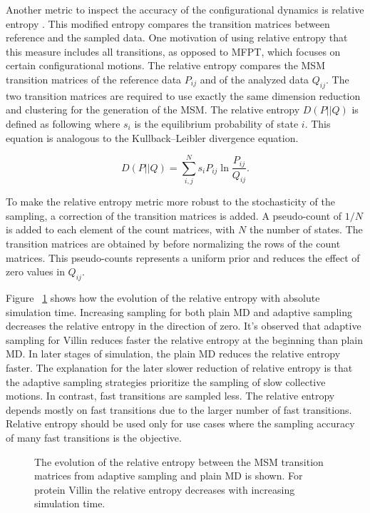 Another metric to inspect the accuracy of the configurational dynamics is relative entropy \cite{bowman2010enhanced}. This modified entropy compares the transition matrices between reference and the sampled data. One motivation of using relative entropy that this measure includes all transitions, as opposed to MFPT, which focuses on certain configurational motions. 
The relative entropy compares the MSM transition matrices of the reference data $P_{ij}$ and of the analyzed data $Q_{ij}$. The two transition matrices are required to use exactly the same dimension reduction and clustering for the generation of the MSM. The relative entropy $D(P||Q)$ is defined as following where $s_{i}$ is the equilibrium probability of state $i$. This equation is analogous to the Kullback–Leibler divergence equation.

\begin{equation}
D(P||Q)=\sum_{i,j}^{N}s_{i}P_{ij}\ln\frac{P_{ij}}{Q_{ij}}. 
\end{equation}

To make the relative entropy metric more robust to the stochasticity of the sampling, a correction of the transition matrices is added. A pseudo-count of $1/N$ is added to each element of the count matrices, with $N$ the number of states. The transition matrices are obtained by before normalizing the rows of the count matrices. This pseudo-counts represents a uniform prior and reduces the effect of zero values in $Q_{ij}$.

Figure ~\ref{fig:rel_ent} shows how the evolution of the relative entropy with absolute simulation time. Increasing sampling for both plain MD and adaptive sampling decreases the relative entropy in the direction of zero. It's observed that adaptive sampling for Villin reduces faster the relative entropy at the beginning than plain MD. In later stages of simulation, the plain MD reduces the relative entropy faster. The explanation for the later slower reduction of relative entropy is that the adaptive sampling strategies prioritize the sampling of slow collective motions. In contrast, fast transitions are sampled less. The relative entropy depends mostly on fast transitions due to the larger number of fast transitions. Relative entropy should be used only for use cases where the sampling accuracy of many fast transitions is the objective.

\begin{figure}[H]
   \centering
   \begin{subfigure}[b]{0.7\linewidth}
   {}
   \end{subfigure}%
   
  \caption{
  The evolution of the relative entropy between the MSM transition matrices from adaptive sampling and plain MD is shown.  For protein Villin the relative entropy decreases with increasing simulation time.}
  \label{fig:rel_ent}
\end{figure}


